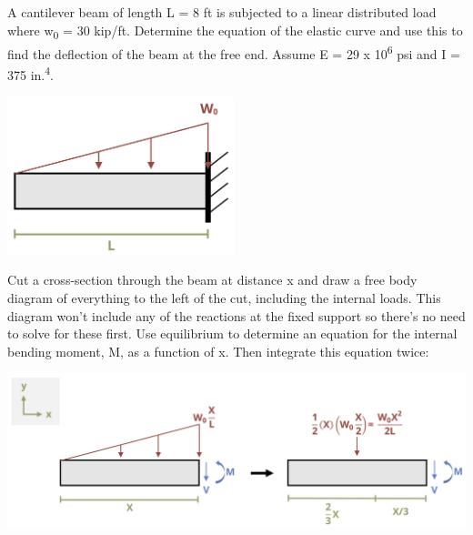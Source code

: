\documentclass[
  letterpaper,
  DIV=11,
  numbers=noendperiod]{scrreprt}
\begin{document}
\begin{tcolorbox}[enhanced jigsaw, colback=white, colframe=quarto-callout-note-color-frame, leftrule=.75mm, opacitybacktitle=0.6, colbacktitle=quarto-callout-note-color!10!white, arc=.35mm, bottomrule=.15mm, breakable, title={Example 11.2}, left=2mm, titlerule=0mm, toptitle=1mm, toprule=.15mm, opacityback=0, rightrule=.15mm, coltitle=black, bottomtitle=1mm]

A cantilever beam of length L = 8 ft is subjected to a linear
distributed load where w\textsubscript{0} = 30 kip/ft. Determine the
equation of the elastic curve and use this to find the deflection of the
beam at the free end. Assume E = 29 x 10\textsuperscript{6} psi and I =
375 in.\textsuperscript{4}.

\begin{center}
\includegraphics[width=2.59375in,height=\textheight]{images/CH11 PNGs/example11.2-1.png}
\end{center}

\begin{tcolorbox}[enhanced jigsaw, colback=white, colframe=quarto-callout-note-color-frame, leftrule=.75mm, opacitybacktitle=0.6, colbacktitle=quarto-callout-note-color!10!white, arc=.35mm, bottomrule=.15mm, breakable, title={Solution}, left=2mm, titlerule=0mm, toptitle=1mm, toprule=.15mm, opacityback=0, rightrule=.15mm, coltitle=black, bottomtitle=1mm]

Cut a cross-section through the beam at distance x and draw a free body
diagram of everything to the left of the cut, including the internal
loads. This diagram won't include any of the reactions at the fixed
support so there's no need to solve for these first. Use equilibrium to
determine an equation for the internal bending moment, M, as a function
of x. Then integrate this equation twice:

\begin{center}
\includegraphics{images/CH11 PNGs/example11.2-2.png}
\end{center}


\end{tcolorbox}
\end{tcolorbox}
\end{document}
